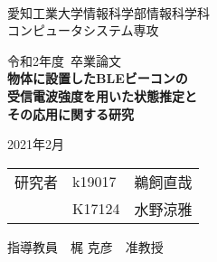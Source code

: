 \begin{titlepage}

\ \\
\begin{center}

{\LARGE 愛知工業大学情報科学部情報科学科\\
コンピュータシステム専攻

\vspace{1.0cm}

令和2年度~卒業論文\\

\vspace{2.0cm}
{\Huge 
\baselineskip=15mm
\textbf{物体に設置したBLEビーコンの\\受信電波強度を用いた状態推定と\\その応用に関する研究\\}}

\vspace{7.0cm}

2021年2月\\

\vspace{1.0cm}

\begin{tabular}[h]{lll}
  研究者  & k19017 & 鵜飼直哉\\
         & K17124 & 水野涼雅\\
\end{tabular}

\vspace{1.0cm}

指導教員\ \ 梶 克彦\ \ 准教授}

\end{center}

\end{titlepage}
    